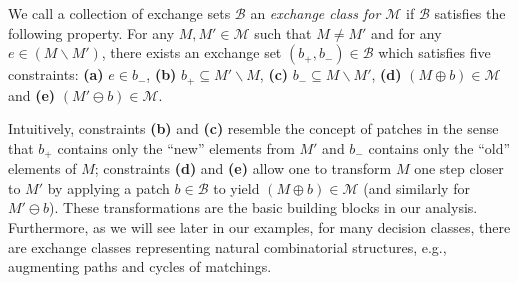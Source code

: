 \documentclass{article}
\newcommand{\wei}[1]{}
\newcommand{\wei}[1]{{\color{blue!50!black}  [\text{Wei:} #1]}}
\newcommand{\M}{\mathcal M}
\newcommand{\B}{\mathcal B}
\newcommand{\del}{\backslash}
\begin{document}
We call a collection of exchange sets $\B$ an \emph{exchange class for $\M$} if $\B$ satisfies the following property.
For any $M,M'\in \M$ such that $M\not = M'$  and for any $e\in (M\del M')$, there exists an exchange set $(b_+,b_-)\in \B$ which satisfies five constraints: \textbf{(a)} $e\in b_-$, \textbf{(b)} $b_+ \subseteq M'\del M$, \textbf{(c)} $b_- \subseteq M \del M'$, \textbf{(d)} $(M\oplus b) \in \M$ and \textbf{(e)} $(M'\ominus b) \in \M$.

Intuitively, constraints \textbf{(b)} and \textbf{(c)} resemble the concept of patches in the sense that $b_+$ contains only the ``new'' elements from $M'$ and $b_-$ contains only the ``old'' elements of $M$; constraints \textbf{(d)} and  \textbf{(e)} allow one to transform $M$ one step closer to $M'$ by applying  a patch $b\in \B$ to yield $(M\oplus b) \in \M$ (and similarly for $M'\ominus b$).
These transformations are the basic building blocks in our analysis.
Furthermore, as we will see later in our examples, for many decision classes, there are exchange classes representing natural combinatorial structures, e.g., augmenting paths and cycles of matchings.
\end{document}
